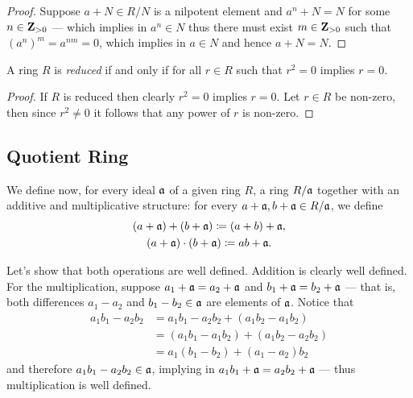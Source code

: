 \begin{proof}
Suppose \(a + N \in R/N\) is a nilpotent element and \(a^n + N = N\) for some
\(n \in \mathbf{Z}_{>0}\) --- which implies in \(a^n \in N\) thus there must exist
\(m \in \mathbf{Z}_{>0}\) such that \((a^n)^m = a^{nm} = 0\), which implies in
\(a \in N\) and hence \(a + N = N\).
\end{proof}

\begin{lemma}
\label{lem:reduced-iff-r2=0-implies-r=0}
A ring \(R\) is \emph{reduced} if and only if for all \(r \in R\) such that
\(r^2 = 0\) implies \(r = 0\).
\end{lemma}

\begin{proof}
If \(R\) is reduced then clearly \(r^2 = 0\) implies \(r = 0\). Let \(r \in R\)
be non-zero, then since \(r^2 \neq 0\) it follows that any power of \(r\) is
non-zero.
\end{proof}

\subsection{Quotient Ring}

We define now, for every ideal \(\mathfrak{a}\) of a given ring \(R\), a ring
\(R/\mathfrak{a}\) together with an additive and multiplicative structure: for
every \(a + \mathfrak{a}, b + \mathfrak{a} \in R/\mathfrak{a}\), we define
\begin{gather*}
(a + \mathfrak{a}) + (b + \mathfrak{a}) \coloneq (a + b) + \mathfrak{a}, \\
(a + \mathfrak{a}) \cdot (b + \mathfrak{a}) \coloneq a b + \mathfrak{a}.
\end{gather*}

Let's show that both operations are well defined. Addition is clearly well
defined. For the multiplication, suppose \(a_1 + \mathfrak{a} = a_2 + \mathfrak{a}\)
and \(b_1 + \mathfrak{a} = b_2 + \mathfrak{a}\) --- that is, both differences
\(a_1 - a_2\) and \(b_1 - b_2 \in \mathfrak{a}\) are elements of
\(\mathfrak{a}\). Notice that
\begin{align*}
a_1 b_1 - a_2 b_2
&= a_1 b_1 - a_2 b_2 + (a_1 b_2 - a_1 b_2) \\
&= (a_1 b_1 - a_1 b_2) + (a_1 b_2 - a_2 b_2) \\
&= a_1 (b_1 - b_2) + (a_1 - a_2) b_2
\end{align*}
and therefore \(a_1 b_1 - a_2 b_2 \in \mathfrak{a}\), implying in
\(a_1 b_1 + \mathfrak{a} = a_2 b_2 + \mathfrak{a}\) --- thus multiplication is well
defined.

